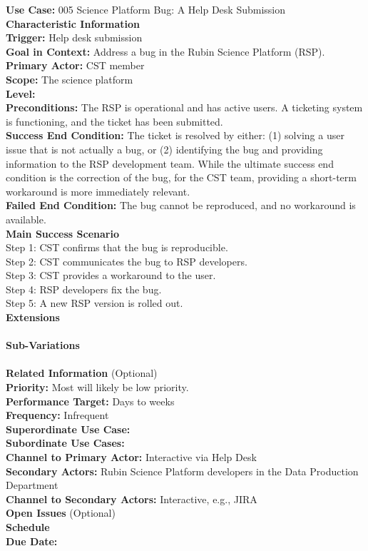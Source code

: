 \textbf{Use Case:} 005 Science Platform Bug: A Help Desk Submission \\

\textbf{Characteristic Information} \\
\textbf{Trigger:} Help desk submission \\
\textbf{Goal in Context:} Address a bug in the Rubin Science Platform (RSP). \\
\textbf{Primary Actor:} CST member \\
\textbf{Scope:} The science platform \\
\textbf{Level:} \\
\textbf{Preconditions:} The RSP is operational and has active users. A ticketing system is functioning, and the ticket has been submitted. \\
\textbf{Success End Condition:} The ticket is resolved by either: (1) solving a user issue that is not actually a bug, or (2) identifying the bug and providing information to the RSP development team. While the ultimate success end condition is the correction of the bug, for the CST team, providing a short-term workaround is more immediately relevant. \\
\textbf{Failed End Condition:} The bug cannot be reproduced, and no workaround is available. \\

\textbf{Main Success Scenario} \\
Step 1: CST confirms that the bug is reproducible. \\
Step 2: CST communicates the bug to RSP developers. \\
Step 3: CST provides a workaround to the user. \\
Step 4: RSP developers fix the bug. \\
Step 5: A new RSP version is rolled out. \\

\textbf{Extensions} \\
\\

\textbf{Sub-Variations} \\
\\

\textbf{Related Information} (Optional) \\
\textbf{Priority:} Most will likely be low priority. \\
\textbf{Performance Target:} Days to weeks \\
\textbf{Frequency:} Infrequent \\
\textbf{Superordinate Use Case:} \\
\textbf{Subordinate Use Cases:} \\
\textbf{Channel to Primary Actor:} Interactive via Help Desk \\
\textbf{Secondary Actors:} Rubin Science Platform developers in the Data Production Department \\
\textbf{Channel to Secondary Actors:} Interactive, e.g., JIRA \\

\textbf{Open Issues} (Optional) \\

\textbf{Schedule} \\
\textbf{Due Date:} \\
